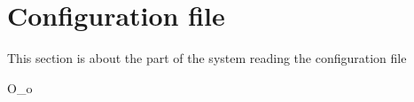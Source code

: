 \section{Configuration file}

This section is about the part of the system reading the configuration file

O\_o
